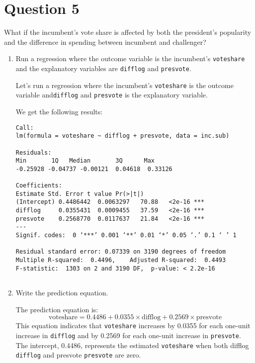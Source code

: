\documentclass[12pt,letterpaper]{article}
\begin{document}
\section*{Question 5}
\noindent What if the incumbent's vote share is affected by both the president's popularity and the difference in spending between incumbent and challenger? 
	\begin{enumerate}
		\item Run a regression where the outcome variable is the incumbent's \texttt{voteshare} and the explanatory variables are \texttt{difflog} and \texttt{presvote}.
		
		
		Let's run a regression where the incumbent's \texttt{voteshare} is the outcome variable and\texttt{difflog} and \texttt{presvote} is the explanatory variable.
		
		
		
		We get the following results:
		
		\begin{verbatim}
Call:
lm(formula = voteshare ~ difflog + presvote, data = inc.sub)

Residuals:
Min       1Q   Median       3Q      Max 
-0.25928 -0.04737 -0.00121  0.04618  0.33126 

Coefficients:
Estimate Std. Error t value Pr(>|t|)    
(Intercept) 0.4486442  0.0063297   70.88   <2e-16 ***
difflog     0.0355431  0.0009455   37.59   <2e-16 ***
presvote    0.2568770  0.0117637   21.84   <2e-16 ***
---
Signif. codes:  0 ‘***’ 0.001 ‘**’ 0.01 ‘*’ 0.05 ‘.’ 0.1 ‘ ’ 1

Residual standard error: 0.07339 on 3190 degrees of freedom
Multiple R-squared:  0.4496,	Adjusted R-squared:  0.4493 
F-statistic:  1303 on 2 and 3190 DF,  p-value: < 2.2e-16
			
		\end{verbatim}
		
		
		\vspace{5cm}
		\item Write the prediction equation.	
		
		The prediction equation is:
		\[
		\text{voteshare} = 0.4486 + 0.0355 \times \text{difflog} + 0.2569 \times \text{presvote}
		\]
		This equation indicates that \texttt{voteshare}  increases by 0.0355 for each one-unit increase in \texttt{difflog}  and by 0.2569 for each one-unit increase in  \texttt{presvote}. The intercept, 0.4486, represents the estimated \texttt{voteshare}  when both difflog \texttt{difflog} and presvote \texttt{presvote} are zero.
		

\end{enumerate}
\end{document}
